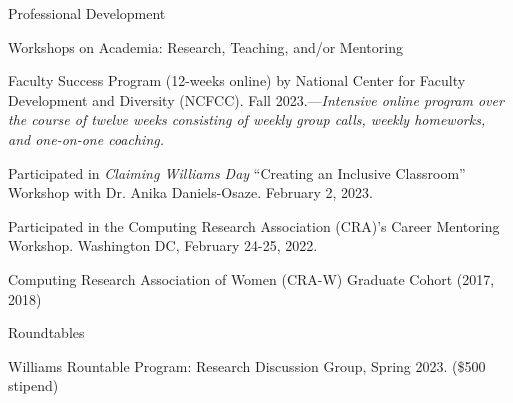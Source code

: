 \documentclass{resume} %
\begin{document}

\begin{rSection}{Professional Development}


\begin{rSubsection}{Workshops on Academia: Research, Teaching, and/or Mentoring}{}{}{}
\item Faculty Success Program (12-weeks online) by National Center for Faculty Development and Diversity (NCFCC). Fall 2023.---\emph{Intensive online program over the course of twelve weeks consisting of weekly group calls, weekly homeworks, and one-on-one coaching.}
\item Participated in \emph{Claiming Williams Day} ``Creating an Inclusive Classroom'' Workshop with Dr. Anika Daniels-Osaze. February 2, 2023.
\item Participated in the Computing Research Association (CRA)'s Career Mentoring Workshop. Washington DC, February 24-25, 2022. 
\item Computing Research Association of Women (CRA-W) Graduate Cohort (2017, 2018)  
\end{rSubsection}

\begin{rSubsection}{Roundtables}{}{}{}
\item Williams Rountable Program: Research Discussion Group, Spring 2023. (\$500 stipend)
\end{rSubsection}
\end{rSection}
\end{document}
